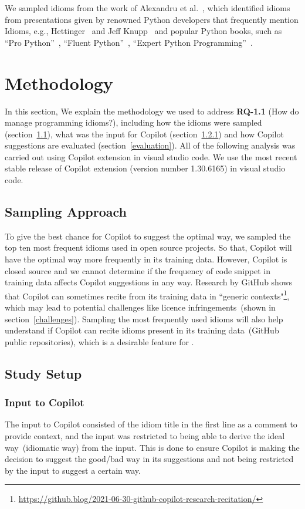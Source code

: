 We sampled idioms from the work of Alexandru et al.~\cite{Alexandru2018}, which identified idioms from presentations given by renowned Python developers that frequently mention Idioms, e.g., Hettinger~\cite{hettinger} and Jeff Knupp~\cite{knupp} and popular Python books, such as ``Pro Python''~\cite{Alchin2010}, ``Fluent Python''~\cite{fluent}, ``Expert Python Programming''~\cite{expert}.

\section{Methodology}
\label{methodology}
In this section, We explain the methodology we used to address \textbf{RQ-1.1} (How do \cct{} manage programming idioms?), including how the idioms were sampled (section~\ref{sampling}), what was the input for Copilot (section~\ref{input}) and how Copilot suggestions are evaluated (section~\ref{evaluation}). All of the following analysis was carried out using Copilot extension in visual studio code. We use the most recent stable release of Copilot extension (version number 1.30.6165) in visual studio code.

\subsection{Sampling Approach}
\label{sampling}
To give the best chance for Copilot to suggest the optimal way, we sampled the top ten most frequent idioms used in open source projects. So that, Copilot will have the optimal way more frequently in its training data. However, Copilot is closed source and we cannot determine if the frequency of code snippet in training data affects Copilot suggestions in any way. Research by GitHub shows that Copilot can sometimes recite from its training data in ``generic contexts"\footnote{\url{https://github.blog/2021-06-30-github-copilot-research-recitation/}}, which may lead to potential challenges like licence infringements~(shown in section~\ref{challenges}). Sampling the most frequently used idioms will also help understand if Copilot can recite idioms present in its training data~(GitHub public repositories), which is a desirable feature for \cct{}.

\subsection{Study Setup}

\subsubsection{Input to Copilot}
\label{input}
The input to Copilot consisted of the idiom title in the first line as a comment to provide context, and the input was restricted to being able to derive the ideal way~(idiomatic way) from the input. This is done to ensure Copilot is making the decision to suggest the good/bad way in its suggestions and not being restricted by the input to suggest a certain way. 

